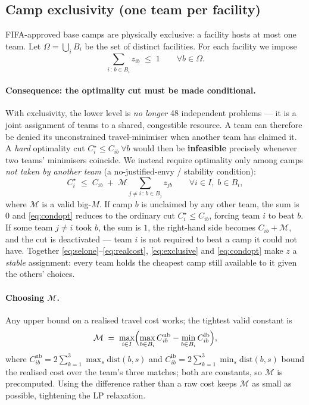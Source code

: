 \documentclass[12pt, letterpaper]{article}
\begin{document}
\subsection{Camp exclusivity (one team per facility)}
\label{sec:exclusive}
FIFA-approved base camps are physically exclusive: a facility hosts at
most one team. Let $\Omega=\bigcup_i B_i$ be the set of distinct
facilities. For each facility we impose
\begin{equation}
\sum_{i\,:\,b\in B_i} z_{ib} \;\le\; 1 \qquad\forall b\in\Omega.
\label{eq:exclusive}
\end{equation}

\paragraph{Consequence: the optimality cut must be made conditional.}
With exclusivity, the lower level is \emph{no longer} 48 independent
problems --- it is a joint assignment of teams to a shared, congestible
resource. A team can therefore be denied its unconstrained
travel-minimiser when another team has claimed it. A \emph{hard}
optimality cut $C_i^\star\le C_{ib}\ \forall b$ would then be
\textbf{infeasible} precisely whenever two teams' minimisers coincide.
We instead require optimality only among camps \emph{not taken by another
team} (a no-justified-envy / stability condition):
\begin{equation}
C_i^\star \;\le\; C_{ib} \;+\;
  \mathcal{M}\!\!\sum_{j\neq i\,:\,b\in B_j} z_{jb}
  \qquad\forall i\in I,\;b\in B_i,
\label{eq:condopt}
\end{equation}
where $\mathcal{M}$ is a valid big-$M$. If camp $b$ is unclaimed by any
other team, the sum is $0$ and \eqref{eq:condopt} reduces to the ordinary
cut $C_i^\star\le C_{ib}$, forcing team $i$ to beat $b$. If some team
$j\neq i$ took $b$, the sum is $1$, the right-hand side becomes
$C_{ib}+\mathcal{M}$, and the cut is deactivated --- team $i$ is not
required to beat a camp it could not have. Together
\eqref{eq:selone}--\eqref{eq:realcost}, \eqref{eq:exclusive} and
\eqref{eq:condopt} make $z$ a \emph{stable} assignment: every team holds
the cheapest camp still available to it given the others' choices.

\paragraph{Choosing $\mathcal{M}$.} Any upper bound on a realised travel
cost works; the tightest valid constant is
\begin{equation}
\mathcal{M} \;=\; \max_{i\in I}\Bigl(\max_{b\in B_i}C^{\mathrm{ub}}_{ib}
  - \min_{b\in B_i}C^{\mathrm{lb}}_{ib}\Bigr),
\end{equation}
where $C^{\mathrm{ub}}_{ib}=2\sum_{k=1}^{3}\max_{s}\mathrm{dist}(b,s)$ and
$C^{\mathrm{lb}}_{ib}=2\sum_{k=1}^{3}\min_{s}\mathrm{dist}(b,s)$ bound the
realised cost over the team's three matches; both are constants, so
$\mathcal{M}$ is precomputed. Using the difference rather than a raw cost
keeps $\mathcal{M}$ as small as possible, tightening the LP relaxation.
\end{document}
